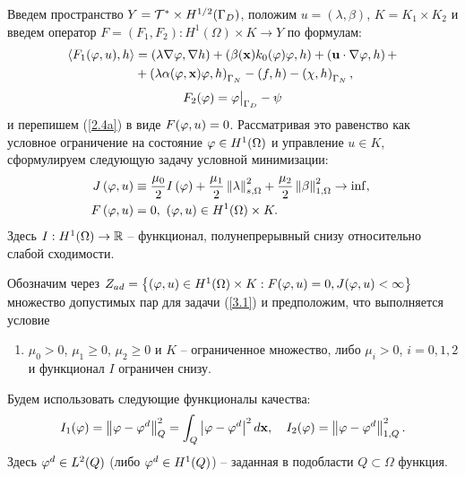 Введем пространство $Y ={\mathcal{T}}^{*} \times H^{1/2} (\Gamma_D)$, положим $u = (\lambda, \beta)$, $K= K_1 \times K_2$ и введем оператор $ F = (F_1, F_2): H^1 (\Omega) \times K \to Y $ по формулам:
\[
	\begin{split}
		\left\langle F_1 (\varphi, u), h \right\rangle &= 
		\left( \lambda \nabla \varphi, \nabla h \right) + \left( \beta (\mathbf{x}) k_0 (\varphi) \varphi, h \right) +
		\left( \mathbf{u} \cdot \nabla \varphi, h \right) + \\
		&+ \left( \lambda \alpha (\varphi, \mathbf{x}) \varphi, h \right)_{\Gamma_N} -
		\left( f, h \right) - \left( \chi, h \right)_{\Gamma_N},
	\end{split}
\]
\[
	F_2 (\varphi) = \varphi\bigl. \bigr\vert_{\Gamma_D} - \psi
\]
и перепишем (\ref{2.4a}) в виде $F (\varphi, u) = 0$. Рассматривая это равенство как условное ограничение на состояние $\varphi \in H^1 (\Omega)$ и управление $u \in K$, сформулируем следующую задачу условной минимизации:
\begin{equation}
	\label{3.1}
	\begin{split}
		J \left( \varphi, u \right) &\equiv \frac{\mu_0}{2} I \left( \varphi \right) 
		+ \frac{\mu_1}{2} \left\Vert \lambda \right\Vert^2_{s,\Omega} 
		+ \frac{\mu_2}{2} \left\Vert \beta \right\Vert^2_{1,\Omega} \rightarrow \inf, ~ \\
		F \left( \varphi, u \right) &= 0, ~ \left( \varphi, u \right) \in H^1 (\Omega) \times K.
	\end{split}
\end{equation}
Здесь $I: H^1 (\Omega) \to \mathbb{R}$ -- функционал, полунепрерывный снизу относительно слабой сходимости.

Обозначим через 
$Z_{ad} = \left\lbrace  \left( \varphi, u \right) \in H^1 (\Omega) \times K: F (\varphi, u) = 0, J(\varphi, u)< \infty  \right\rbrace$ множество допустимых пар для задачи (\ref{3.1}) и предположим, что выполняется условие

\begin{enumerate}

	\item[\enumilab{jconds2}{(jj)}]
		$\mu_0 >0$, $\mu_1 \ge 0$, $\mu_2 \ge 0$  и $K$ -- ограниченное множество, либо $\mu_i > 0$, $i = 0,1,2$ и функционал $I$ ограничен снизу.

\end{enumerate}

Будем использовать следующие функционалы качества: 
\begin{equation}
	\label{cost_f}
	I_1 (\varphi) = \left\Vert \varphi - \varphi^d \right\Vert^2_Q = 
	\int_Q \left\vert \varphi - \varphi^d \right\vert^2 d \mathbf{x}, \quad 
	I_2 (\varphi) = \left\Vert \varphi - \varphi^d \right\Vert_{1,Q}^2.
\end{equation}
Здесь $\varphi^d \in L^2 (Q)$ (либо $\varphi^d \in H^1 (Q)$) -- заданная в подобласти $Q \subset \Omega$ функция.

